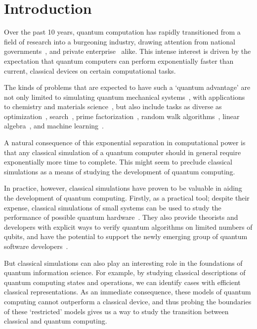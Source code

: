 
\chapter{Introduction}\label{chap:introduction}
Over the past 10 years, quantum computation has rapidly transitioned from a field of research into a burgeoning industry, drawing attention from national governments~\cite{UKNQTP,QuantumFlagship}, and private enterprise~\cite{IBMQ,GoogleQuantum,MicrosoftQuantum} alike. This intense interest is driven by the expectation that quantum computers can perform exponentially faster than current, classical devices on certain computational tasks.\par
The kinds of problems that are expected to have such a `quantum advantage' are not only limited to simulating quantum mechanical systems~\cite{Lloyd1996}, with applications to chemistry and materials science~\cite{Brown2010}, but also include tasks as diverse as optimization~\cite{Moll2018}, search~\cite{Grover1996}, prime factorization~\cite{Shor1994}, random walk algorithms~\cite{Kendon2006}, linear algebra~\cite{Harrow2009}, and machine learning~\cite{Biamonte2017}.\par
A natural consequence of this exponential separation in computational power is that any classical simulation of a quantum computer should in general require exponentially more time to complete. This might seem to preclude classical simulations as a means of studying the development of quantum computing.\par
In practice, however, classical simulations have proven to be valuable in aiding the development of quantum computing. Firstly, as a practical tool; despite their expense, classical simulations of small systems can be used to study the performance of possible quantum hardware~\cite{Cai2019}. They also provide theorists and developers with explicit ways to verify quantum algorithms on limited numbers of qubits, and have the potential to support the newly emerging group of quantum software developers~\cite{Qiskit,MicrosoftQDK,CircAnnouncement}.\par
But classical simulations can also play an interesting role in the foundations of quantum information science. For example, by studying classical descriptions of quantum computing states and operations, we can identify cases with efficient classical representations. As an immediate consequence, these models of quantum computing cannot outperform a classical device, and thus probing the boundaries of these `restricted' models gives us a way to study the transition between classical and quantum computing.\par
